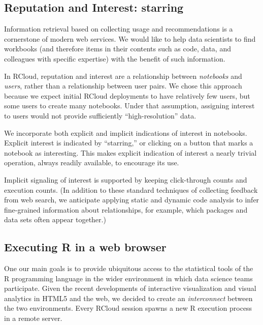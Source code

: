 \subsection{Reputation and Interest: starring\label{sec:starring}}

Information retrieval based on collecting usage and recommendations
is a cornerstone of modern web services. We would like to help data
scientists to find workbooks (and therefore items in their contents
such as code, data, and colleagues with specific expertise) with
the benefit of such information.

In RCloud, reputation and interest are a relationship between
\emph{notebooks} and \emph{users}, rather than a relationship between
user pairs. We chose this approach because we expect initial 
RCloud deployments to have relatively few users, but some users to
create many notebooks. Under that assumption, assigning interest
to users would not provide sufficiently ``high-resolution'' data.

We incorporate both explicit and implicit indications of interest
in notebooks. Explicit interest is indicated by ``starring,'' or
clicking on a button that marks a notebook as interesting.
This makes explicit indication of interest a nearly trivial operation,
always readily available, to encourage its use.

Implicit signaling of interest is supported by keeping click-through counts
\cite{Joachims:2005:AIC} and execution counts. (In addition to these
standard techniques of collecting feedback from web search, we anticipate
applying static and dynamic code analysis to infer fine-grained
information about relationships, for example, which packages and data
sets often appear together.)

\subsection{Executing R in a web browser\label{sec:Rinbrowser}}

One our main goals is to provide ubiquitous access to the statistical
tools of the R programming language in the wider environment in which data
science teams participate.
%
Given the recent developments of interactive visualization and visual
analytics in HTML5 and the web, we decided to create an
\emph{interconnect} between the two environments.
%
Every RCloud session spawns a new R execution process in a remote
server.


